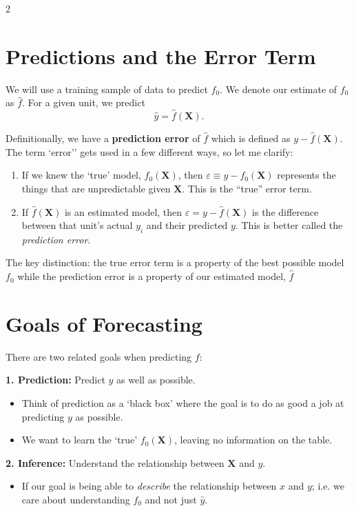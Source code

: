 \documentclass[12pt]{article}
\begin{document}
\begin{multicols}{2}
  \section*{Predictions and the Error Term}

  We will use a training sample of data to predict $f_0$.
  We denote our estimate of $f_0$ as $\hat{f}$.
  For a given unit, we predict
  $$\hat{y} = \hat{f}(\bm{X}).$$

  Definitionally, we have a \textbf{prediction error} of $\hat{f}$ which is defined as $y - \hat{f}(\bm{X})$.
  The term `error'' gets used in a few different ways, so let me clarify:

  \begin{enumerate}
    \item If we knew the `true' model, $f_0(\bm{X})$, then $\varepsilon \equiv y - f_0(\bm{X})$ represents the things that are unpredictable given $\bm{X}$.
      This is the ``true'' error term.

      \smallskip
    \item If $\hat{f}(\bm{X})$ is an estimated model, then $\hat{\varepsilon} = y - \hat{f}(\bm{X})$ is the difference between that unit's actual $y_i$ and their predicted $y$.
      This is better called the \emph{prediction error}.
  \end{enumerate}

  The key distinction: the true error term is a property of the best possible model $f_0$ while the prediction error is a property of our estimated model, $\hat{f}$

  \section*{Goals of Forecasting}

  There are two related goals when predicting $f$:

  \noindent\textbf{1. Prediction:} Predict $y$ as well as possible.
  \begin{itemize}
    \item Think of prediction as a `black box' where the goal is to do as good a job at predicting $y$ as possible.
    \item We want to learn the `true' $f_0(\bm{X})$, leaving no information on the table.
  \end{itemize}

  \noindent\textbf{2. Inference:} Understand the relationship between $\bm{X}$ and $y$.
  \begin{itemize}
    \item If our goal is being able to \emph{describe} the relationship between $x$ and $y$; i.e. we care about understanding $f_0$ and not just $\hat{y}$.


\end{itemize}
\end{multicols}
\end{document}
